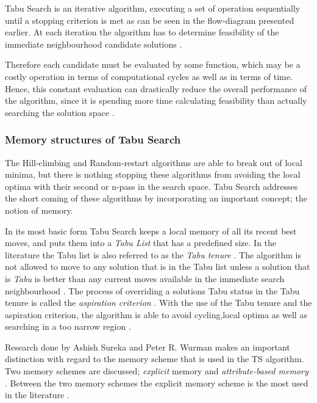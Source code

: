 Tabu Search is an iterative algorithm, executing a set of operation sequentially until a stopping criterion is met as can be seen in the flow-diagram presented earlier. At each iteration the algorithm has to determine feasibility of the immediate neighbourhood candidate solutions \cite{EvoParallelTabu,TabuVechicleRoutingWithTimeWindows}. 

Therefore each candidate must be evaluated by some function, which may be a costly operation in terms of computational cycles as well as in terms of time. Hence, this constant evaluation can drastically reduce the overall performance of the algorithm, since it is spending more time calculating feasibility than actually searching the solution space \cite{EvoParallelTabu,TabuVechicleRoutingWithTimeWindows}.

\subsubsection{Memory structures of Tabu Search}
The Hill-climbing and Random-restart algorithms are able to break out of local minima, but there is nothing stopping these algorithms from avoiding the local optima with their second or n-pass in the search space. Tabu Search addresses the short coming of these algorithms by incorporating an important concept; the notion of memory.

In its most basic form Tabu Search keeps a local memory of all its recent best moves, and puts them into a \emph{Tabu List} that has a predefined size. In the literature the Tabu list is also referred to as the \emph{Tabu tenure} \cite{TSHazardous,TabuCarryOver,ReactiveTabuVHR,TabuParameterization}. The algorithm is not allowed to move to any solution that is in the Tabu list unless a solution that is \emph{Tabu} is better than any current moves available in the immediate search neighbourhood \cite{TSHazardous,TabuCarryOver,ReactiveTabuVHR,TabuParameterization}. The process of overriding a solutions Tabu status in the Tabu tenure is called the \emph{aspiration criterion} \cite{TSHazardous,TabuCarryOver,ReactiveTabuVHR,TabuParameterization}. With the use of the Tabu tenure and the aspiration criterion, the algorithm is able to avoid cycling,local optima as well as searching in a too narrow region \cite{TabuSingleMachineScheduling,CircuitTabu}.

Research done by Ashish Sureka and Peter R. Wurman makes an important distinction with regard to the memory scheme that is used in the TS algorithm. Two memory schemes are discussed; \emph{explicit} memory and \emph{attribute-based memory} \cite{TabuBiddingStrats,TabuFormGames}. Between the two memory schemes the explicit memory scheme is the most used in the literature \cite{TabuVechicleRoutingWithTimeWindows}.

